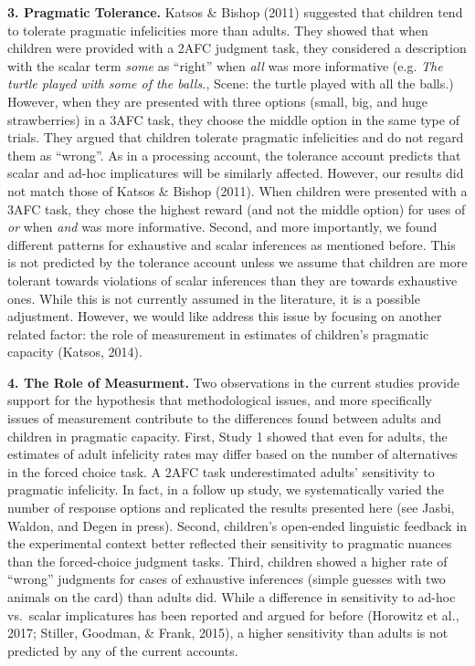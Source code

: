 \documentclass[floatsintext,man]{apa6}
\theoremstyle{definition}
\theoremstyle{definition}
\theoremstyle{definition}
\theoremstyle{remark}
\begin{document}
\textbf{3. Pragmatic Tolerance.} Katsos \& Bishop (2011) suggested that
children tend to tolerate pragmatic infelicities more than adults. They
showed that when children were provided with a 2AFC judgment task, they
considered a description with the scalar term \emph{some} as
\enquote{right} when \emph{all} was more informative (e.g. \emph{The
turtle played with some of the balls.}, Scene: the turtle played with
all the balls.) However, when they are presented with three options
(small, big, and huge strawberries) in a 3AFC task, they choose the
middle option in the same type of trials. They argued that children
tolerate pragmatic infelicities and do not regard them as
\enquote{wrong}. As in a processing account, the tolerance account
predicts that scalar and ad-hoc implicatures will be similarly affected.
However, our results did not match those of Katsos \& Bishop (2011).
When children were presented with a 3AFC task, they chose the highest
reward (and not the middle option) for uses of \emph{or} when \emph{and}
was more informative. Second, and more importantly, we found different
patterns for exhaustive and scalar inferences as mentioned before. This
is not predicted by the tolerance account unless we assume that children
are more tolerant towards violations of scalar inferences than they are
towards exhaustive ones. While this is not currently assumed in the
literature, it is a possible adjustment. However, we would like address
this issue by focusing on another related factor: the role of
measurement in estimates of children's pragmatic capacity (Katsos,
2014).

\textbf{4. The Role of Measurment.} Two observations in the current
studies provide support for the hypothesis that methodological issues,
and more specifically issues of measurement contribute to the
differences found between adults and children in pragmatic capacity.
First, Study 1 showed that even for adults, the estimates of adult
infelicity rates may differ based on the number of alternatives in the
forced choice task. A 2AFC task underestimated adults' sensitivity to
pragmatic infelicity. In fact, in a follow up study, we systematically
varied the number of response options and replicated the results
presented here (see Jasbi, Waldon, and Degen in press). Second,
children's open-ended linguistic feedback in the experimental context
better reflected their sensitivity to pragmatic nuances than the
forced-choice judgment tasks. Third, children showed a higher rate of
\enquote{wrong} judgments for cases of exhaustive inferences (simple
guesses with two animals on the card) than adults did. While a
difference in sensitivity to ad-hoc vs.~scalar implicatures has been
reported and argued for before (Horowitz et al., 2017; Stiller, Goodman,
\& Frank, 2015), a higher sensitivity than adults is not predicted by
any of the current accounts.
\end{document}
